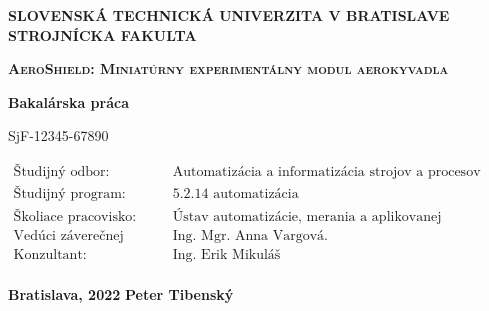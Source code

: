 \thispagestyle{empty}

\noindent \begin{center}
\textbf{{\large{}SLOVENSKÁ TECHNICKÁ UNIVERZITA V BRATISLAVE}}\\
\textbf{{\large{}STROJNÍCKA FAKULTA}}\textbf{\large{} }\\
\vspace{3cm}
\par\end{center}

\noindent \begin{center}
\vspace{3cm}
\par\end{center}



\begin{center}
\textbf{\textsc{\Large{}AeroShield: Miniatúrny experimentálny modul aerokyvadla}}\\
\par\end{center}{\Large \par}

\begin{center}
\textbf{\large{}Bakalárska práca}\\
\par\end{center}{\large \par}

\begin{center}
{\large{}SjF-12345-67890}\\
\end{center}


\vfill
\begin{flushleft}
$\begin{array}{ll}
\text{Študijný odbor:}&\text{Automatizácia a informatizácia strojov a procesov}\\
\text{Študijný program:}&\text{5.2.14 automatizácia}\\
\text{Školiace pracovisko:}&\text{Ústav automatizácie, merania a aplikovanej informatiky}\\
\text{Vedúci záverečnej práce:}&\text{Ing. Mgr. Anna Vargová.}\\
\text{Konzultant:}&\text{Ing. Erik Mikuláš}\\
\end{array}$
\end{flushleft}
\vspace{0.5cm}
\noindent \textbf{\large{}Bratislava, 2022} \hfill \textbf{\large{}Peter Tibenský}
\cleardoublepage
